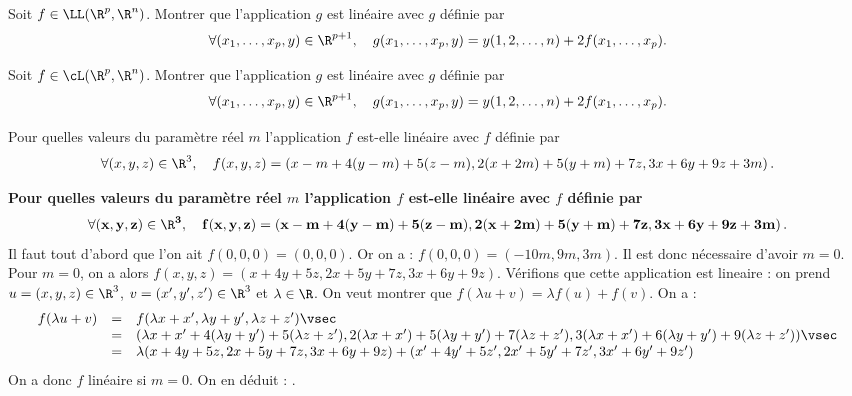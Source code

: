 \documentclass[a4paper, 11pt,reqno]{article}
\begin{document}
\begin{exercice}
Soit $f\in\LL (\R^p,\R^n)$. Montrer que l'application $g$ est lin\'eaire avec $g$ d\'efinie par
$$\forall (x_1,\dots,x_p,y)\in\R^{p+1},\quad g(x_1,\dots,x_p,y)=y(1,2,\dots,n)+2f(x_1,\dots,x_p).$$
\end{exercice}
\begin{correction}
Soit $f\in\cL (\R^p,\R^n)$. Montrer que l'application $g$ est lin\'eaire avec $g$ d\'efinie par
$$\forall (x_1,\dots,x_p,y)\in\R^{p+1},\quad g(x_1,\dots,x_p,y)=y(1,2,\dots,n)+2f(x_1,\dots,x_p).$$
\end{correction}
\begin{exercice}  \;
	Pour quelles valeurs du param\`etre r\'eel $m$ l'application $f$ est-elle lin\'eaire avec $f$ d\'efinie par
	$$\forall (x,y,z)\in\R^3,\quad f(x,y,z)=\left(x-m+4(y-m)+5(z-m),2(x+2m)+5(y+m)+7z, 3x+6y+9z+3m\right).$$
\end{exercice}
\begin{correction}  \;
	\textbf{Pour quelles valeurs du param\`etre r\'eel $m$ l'application $f$ est-elle lin\'eaire avec $f$ d\'efinie par}
	$$\mathbf{\forall (x,y,z)\in\R^3,\quad f(x,y,z)=\left(x-m+4(y-m)+5(z-m),2(x+2m)+5(y+m)+7z, 3x+6y+9z+3m\right).}$$
	Il faut tout d'abord que l'on ait $f(0,0,0) = (0,0,0)$. Or on a : $f(0,0,0)=(-10m,9m,3m)$. Il est donc n\'ecessaire d'avoir $m=0$.\\
	Pour $m=0$, on a alors $f(x,y,z) = (x+4y+5z, 2x +5y+7z, 3x+6y+9z)$. V\'erifions que cette application est lin\?eaire : on prend $u=(x,y,z) \in \R^3$, $v=(x',y',z') \in \R^3$ et $\lambda \in \R$. On veut montrer que $f(\lambda u + v) = \lambda f(u) + f(v)$. On a :
	$$\begin{array}{rcl}
			f(\lambda u + v) & = & f(\lambda x + x', \lambda y + y', \lambda z + z') \vsec                                                                                                                   \\
			                 & = & (\lambda x + x'+4(\lambda y + y')+5(\lambda z + z'), 2(\lambda x + x') +5(\lambda y + y')+7(\lambda z + z'), 3(\lambda x + x')+6(\lambda y + y')+9(\lambda z + z')) \vsec \\
			                 & = & \lambda (x+4y+5z, 2x +5y+7z, 3x+6y+9z) + (x'+4y'+5z', 2x' +5y'+7z', 3x'+6y'+9z')
		\end{array}$$
	On a donc $f$ lin\'eaire si $m=0$. On en d\'eduit :  .
\end{correction}
\end{document}
